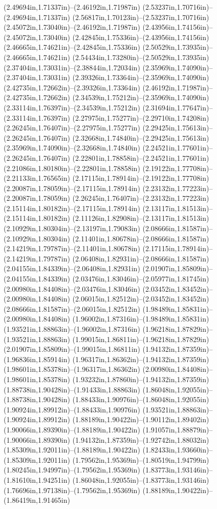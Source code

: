 (2.49694in,1.71337in)--(2.46192in,1.71987in) (2.53237in,1.70716in)--(2.49694in,1.71337in) (2.56817in,1.70123in)--(2.53237in,1.70716in) (2.45072in,1.73040in)--(2.46192in,1.71987in) (2.43956in,1.74156in)--(2.45072in,1.73040in) (2.42845in,1.75336in)--(2.43956in,1.74156in) (2.46665in,1.74621in)--(2.42845in,1.75336in) (2.50529in,1.73935in)--(2.46665in,1.74621in) (2.54434in,1.73280in)--(2.50529in,1.73935in) (2.37404in,1.73031in)--(2.38844in,1.72034in) (2.35969in,1.74090in)--(2.37404in,1.73031in) (2.39326in,1.73364in)--(2.35969in,1.74090in) (2.42735in,1.72662in)--(2.39326in,1.73364in) (2.46192in,1.71987in)--(2.42735in,1.72662in) (2.34539in,1.75212in)--(2.35969in,1.74090in) (2.33114in,1.76397in)--(2.34539in,1.75212in) (2.31694in,1.77647in)--(2.33114in,1.76397in) (2.27975in,1.75277in)--(2.29710in,1.74208in) (2.26245in,1.76407in)--(2.27975in,1.75277in) (2.29425in,1.75613in)--(2.26245in,1.76407in) (2.32668in,1.74840in)--(2.29425in,1.75613in) (2.35969in,1.74090in)--(2.32668in,1.74840in) (2.24521in,1.77601in)--(2.26245in,1.76407in) (2.22801in,1.78858in)--(2.24521in,1.77601in) (2.21086in,1.80180in)--(2.22801in,1.78858in) (2.19122in,1.77708in)--(2.21133in,1.76565in) (2.17115in,1.78914in)--(2.19122in,1.77708in) (2.20087in,1.78059in)--(2.17115in,1.78914in) (2.23132in,1.77223in)--(2.20087in,1.78059in) (2.26245in,1.76407in)--(2.23132in,1.77223in) (2.15114in,1.80182in)--(2.17115in,1.78914in) (2.13117in,1.81513in)--(2.15114in,1.80182in) (2.11126in,1.82908in)--(2.13117in,1.81513in) (2.10929in,1.80304in)--(2.13197in,1.79083in) (2.08666in,1.81587in)--(2.10929in,1.80304in) (2.11401in,1.80678in)--(2.08666in,1.81587in) (2.14219in,1.79787in)--(2.11401in,1.80678in) (2.17115in,1.78914in)--(2.14219in,1.79787in) (2.06408in,1.82931in)--(2.08666in,1.81587in) (2.04155in,1.84339in)--(2.06408in,1.82931in) (2.01907in,1.85809in)--(2.04155in,1.84339in) (2.03476in,1.83046in)--(2.05977in,1.81745in) (2.00980in,1.84408in)--(2.03476in,1.83046in) (2.03452in,1.83452in)--(2.00980in,1.84408in) (2.06015in,1.82512in)--(2.03452in,1.83452in) (2.08666in,1.81587in)--(2.06015in,1.82512in) (1.98489in,1.85831in)--(2.00980in,1.84408in) (1.96002in,1.87316in)--(1.98489in,1.85831in) (1.93521in,1.88863in)--(1.96002in,1.87316in) (1.96218in,1.87829in)--(1.93521in,1.88863in) (1.99015in,1.86811in)--(1.96218in,1.87829in) (2.01907in,1.85809in)--(1.99015in,1.86811in) (1.94132in,1.87359in)--(1.96836in,1.85914in) (1.96317in,1.86362in)--(1.94132in,1.87359in) (1.98601in,1.85378in)--(1.96317in,1.86362in) (2.00980in,1.84408in)--(1.98601in,1.85378in) (1.93232in,1.87860in)--(1.94132in,1.87359in) (1.88738in,1.90428in)--(1.91433in,1.88863in) (1.86048in,1.92055in)--(1.88738in,1.90428in) (1.88433in,1.90976in)--(1.86048in,1.92055in) (1.90924in,1.89912in)--(1.88433in,1.90976in) (1.93521in,1.88863in)--(1.90924in,1.89912in) (1.88189in,1.90422in)--(1.90112in,1.89402in) (1.90066in,1.89390in)--(1.88189in,1.90422in) (1.91057in,1.88879in)--(1.90066in,1.89390in) (1.94132in,1.87359in)--(1.92742in,1.88032in) (1.85309in,1.92011in)--(1.88189in,1.90422in) (1.82433in,1.93660in)--(1.85309in,1.92011in) (1.79562in,1.95369in)--(1.80519in,1.94799in) (1.80245in,1.94997in)--(1.79562in,1.95369in) (1.83773in,1.93146in)--(1.81610in,1.94251in) (1.86048in,1.92055in)--(1.83773in,1.93146in) (1.76696in,1.97138in)--(1.79562in,1.95369in) (1.88189in,1.90422in)--(1.86419in,1.91465in) 